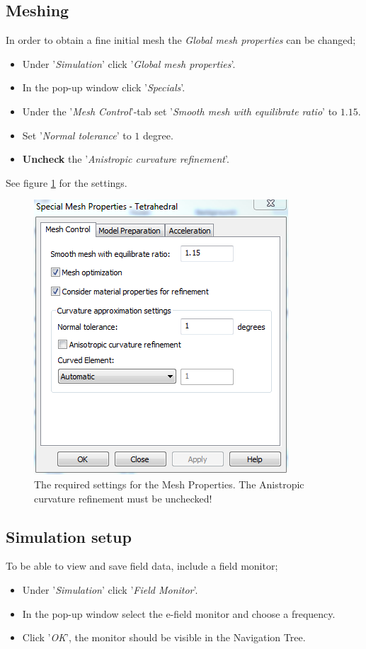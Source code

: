 \subsection{Meshing}
In order to obtain a fine initial mesh the \textit{Global mesh properties} can be changed;
\begin{itemize}
	\item Under '\textit{Simulation}' click '\textit{Global mesh properties}'.
	\item In the pop-up window click '\textit{Specials}'.
	\item Under the '\textit{Mesh Control}'-tab set '\textit{Smooth mesh with equilibrate ratio}' to \(1.15\).
	\item Set '\textit{Normal tolerance}' to \(1\) degree.
	\item \textbf{Uncheck} the '\textit{Anistropic curvature refinement}'.  
\end{itemize}
See figure \ref{fig:MeshProperties} for the settings.
\begin{figure}
	\begin{center}
		\includegraphics[scale = .6]{Figures/MeshProperties}
		\caption{The required settings for the Mesh Properties. The Anistropic curvature refinement must be unchecked!}
		\label{fig:MeshProperties}
	\end{center}
\end{figure}

\subsection{Simulation setup}
To be able to view and save field data, include a field monitor;
\begin{itemize}
	\item Under '\textit{Simulation}' click '\textit{Field Monitor}'.
	\item In the pop-up window select the e-field monitor and choose a frequency.
	\item Click '\textit{OK}', the monitor should be visible in the Navigation Tree.
\end{itemize}

